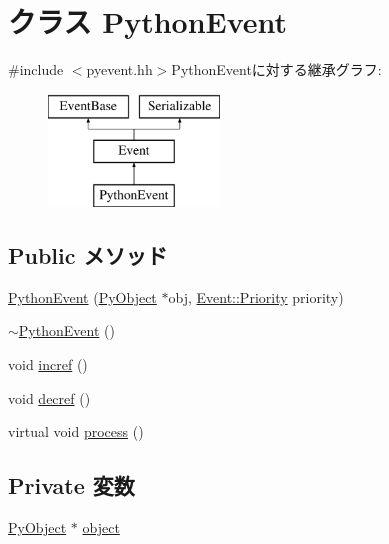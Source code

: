 \hypertarget{classPythonEvent}{
\section{クラス PythonEvent}
\label{classPythonEvent}
}


{\ttfamily \#include $<$pyevent.hh$>$}PythonEventに対する継承グラフ:\begin{figure}[H]
\begin{center}
\leavevmode
\includegraphics[height=3cm]{classPythonEvent}
\end{center}
\end{figure}
\subsection*{Public メソッド}
\begin{DoxyCompactItemize}
\item 
\hyperlink{classPythonEvent_a7b5b591484681e521fc822e2e17492ff}{PythonEvent} (\hyperlink{init_8hh_ae19630c1f4ca6d5236b30719d9140013}{PyObject} $\ast$obj, \hyperlink{classEventBase_a6d92f7ee8144a5911ed46d85a89a4934}{Event::Priority} priority)
\item 
\hyperlink{classPythonEvent_a3c32227a61801ec263cc1bb68f5a0546}{$\sim$PythonEvent} ()
\item 
void \hyperlink{classPythonEvent_ad16d34c97e8d6a988fd2b5ea36bccbf4}{incref} ()
\item 
void \hyperlink{classPythonEvent_a0ff5c4fba5e67643030a3e2f5b70a737}{decref} ()
\item 
virtual void \hyperlink{classPythonEvent_a2e9c5136d19b1a95fc427e0852deab5c}{process} ()
\end{DoxyCompactItemize}
\subsection*{Private 変数}
\begin{DoxyCompactItemize}
\item 
\hyperlink{init_8hh_ae19630c1f4ca6d5236b30719d9140013}{PyObject} $\ast$ \hyperlink{classPythonEvent_adb7ba59fec8a5847f73c56fccee0f1a0}{object}
\end{DoxyCompactItemize}


